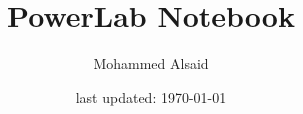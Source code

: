 \documentclass{article}
\title{PowerLab Notebook}
\author{Mohammed Alsaid}
\date{last updated: \today}
\begin{document}
    \maketitle
    \newpage
    
    \tableofcontents
    \newpage
    
    
    \newpage
    \nocite{*}
    
    
\end{document}

